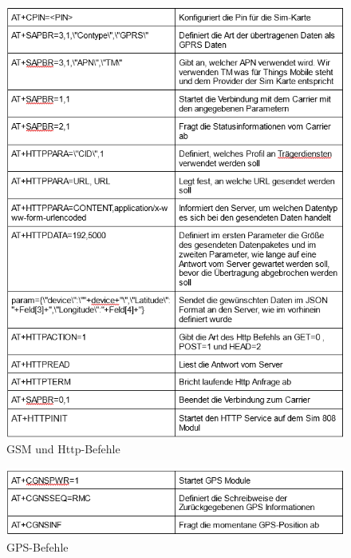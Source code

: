 \begin{figure} [H]
 \begin{center}
		\includegraphics[width=1\textwidth]{Bilder/Arduino_Befehlstabelle_1.png}
		\caption{GSM und Http-Befehle}
		\label{Gsm_http}
	\end{center}
\end{figure}
\begin{figure} [H]
 \begin{center}
		\includegraphics[width=1\textwidth]{Bilder/Arduino_Befehlstabelle_2.png}
		\caption{GPS-Befehle}
		\label{GPS}
	\end{center}
\end{figure}
